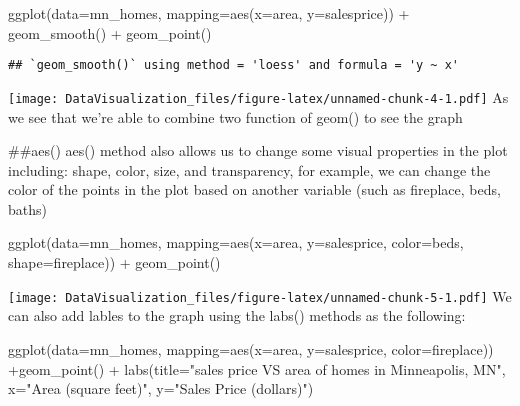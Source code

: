 \documentclass[
]{article}
\newenvironment{Shaded}{\begin{snugshade}}{\end{snugshade}}
\newcommand{\AttributeTok}[1]{\textcolor[rgb]{0.77,0.63,0.00}{#1}}
\newcommand{\FunctionTok}[1]{\textcolor[rgb]{0.00,0.00,0.00}{#1}}
\newcommand{\NormalTok}[1]{#1}
\newcommand{\SpecialCharTok}[1]{\textcolor[rgb]{0.00,0.00,0.00}{#1}}
\newcommand{\StringTok}[1]{\textcolor[rgb]{0.31,0.60,0.02}{#1}}
\begin{document}
\begin{Shaded}
\begin{Highlighting}[]
\FunctionTok{ggplot}\NormalTok{(}\AttributeTok{data=}\NormalTok{mn\_homes, }\AttributeTok{mapping=}\FunctionTok{aes}\NormalTok{(}\AttributeTok{x=}\NormalTok{area, }\AttributeTok{y=}\NormalTok{salesprice)) }\SpecialCharTok{+} \FunctionTok{geom\_smooth}\NormalTok{() }\SpecialCharTok{+} \FunctionTok{geom\_point}\NormalTok{()}
\end{Highlighting}
\end{Shaded}

\begin{verbatim}
## `geom_smooth()` using method = 'loess' and formula = 'y ~ x'
\end{verbatim}

\texttt{[image: DataVisualization\_files/figure-latex/unnamed-chunk-4-1.pdf]}
As we see that we're able to combine two function of geom() to see the
graph

\#\#aes() aes() method also allows us to change some visual properties
in the plot including: shape, color, size, and transparency, for
example, we can change the color of the points in the plot based on
another variable (such as fireplace, beds, baths)

\begin{Shaded}
\begin{Highlighting}[]
\FunctionTok{ggplot}\NormalTok{(}\AttributeTok{data=}\NormalTok{mn\_homes, }\AttributeTok{mapping=}\FunctionTok{aes}\NormalTok{(}\AttributeTok{x=}\NormalTok{area, }\AttributeTok{y=}\NormalTok{salesprice, }\AttributeTok{color=}\NormalTok{beds, }\AttributeTok{shape=}\NormalTok{fireplace)) }\SpecialCharTok{+} \FunctionTok{geom\_point}\NormalTok{()}
\end{Highlighting}
\end{Shaded}

\texttt{[image: DataVisualization\_files/figure-latex/unnamed-chunk-5-1.pdf]}
We can also add lables to the graph using the labs() methods as the
following:

\begin{Shaded}
\begin{Highlighting}[]
\FunctionTok{ggplot}\NormalTok{(}\AttributeTok{data=}\NormalTok{mn\_homes, }\AttributeTok{mapping=}\FunctionTok{aes}\NormalTok{(}\AttributeTok{x=}\NormalTok{area, }\AttributeTok{y=}\NormalTok{salesprice, }\AttributeTok{color=}\NormalTok{fireplace)) }\SpecialCharTok{+}\FunctionTok{geom\_point}\NormalTok{() }\SpecialCharTok{+} \FunctionTok{labs}\NormalTok{(}\AttributeTok{title=}\StringTok{"sales price VS area of homes in Minneapolis, MN"}\NormalTok{, }\AttributeTok{x=}\StringTok{"Area (square feet)"}\NormalTok{, }\AttributeTok{y=}\StringTok{"Sales Price (dollars)"}\NormalTok{)}
\end{Highlighting}
\end{Shaded}
\end{document}
